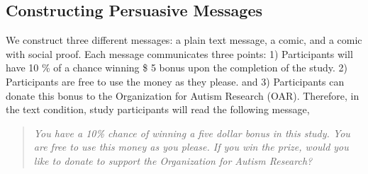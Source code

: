 


\subsection{Constructing Persuasive Messages}
\label{sub:Constructing Persuasive Messages}





We construct three different messages: a plain text message, a comic, and a comic with social proof. Each message communicates three points: 1) Participants will have 10 \% of a chance winning \$ 5 bonus upon the completion of the study. 2) Participants are free to use the money as they please. and 3) Participants can donate this bonus to the Organization for Autism Research (OAR). Therefore, in the text condition, study participants will read the following message,
\begin{quote}
  \textit{You have a 10\% chance of winning a five dollar bonus in this study. You are free to use this money as you please. If you win the prize, would you like to donate to support the Organization for Autism Research?}
\end{quote}


